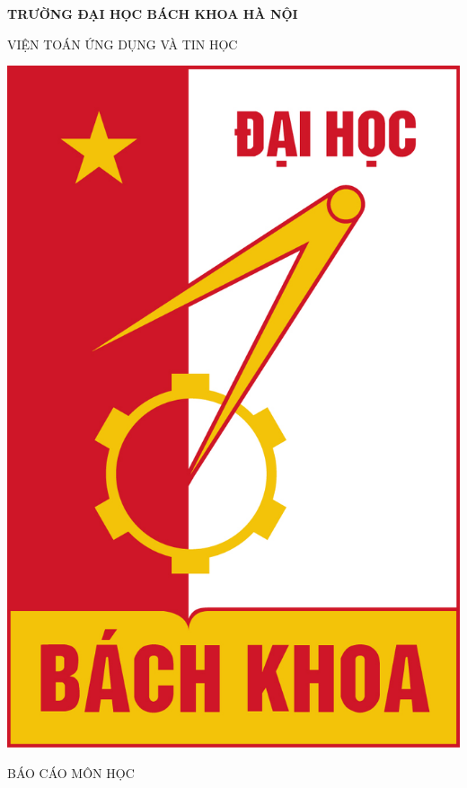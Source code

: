 \documentclass[12pt,a4paper,oneside]{book}
\begin{document}
\begin{titlepage}
	\thisfancypage{\setlength{\fboxsep}{10pt}\doublebox}{}
	\begin{center}
		\begin{Large}\bfseries
			TRƯỜNG ĐẠI HỌC BÁCH KHOA HÀ NỘI\par
			VIỆN TOÁN ỨNG DỤNG VÀ TIN HỌC\par
		\end{Large}
		\vspace{1.5cm}
		\includegraphics[scale=0.3]{images/logo_bk.jpg}\par
		\vspace{1.5cm}
		\begin{LARGE}
			\MakeUppercase{Báo cáo môn học}\par
		\end{LARGE}

\end{center}
\end{titlepage}
\end{document}
